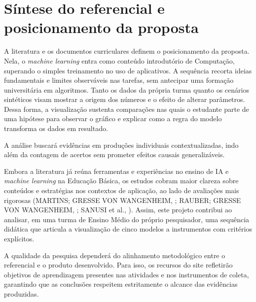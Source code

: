 \section{Síntese do referencial e posicionamento da proposta}

A literatura e os documentos curriculares definem o posicionamento da proposta. Nela, o \textit{machine learning} entra como conteúdo introdutório de Computação, superando o simples treinamento no uso de aplicativos. A sequência recorta ideias fundamentais e limites observáveis nas tarefas, sem antecipar uma formação universitária em algoritmos. Tanto os dados da própria turma quanto os cenários sintéticos visam mostrar a origem dos números e o efeito de alterar parâmetros. Dessa forma, a visualização sustenta comparações nas quais o estudante parte de uma hipótese para observar o gráfico e explicar como a regra do modelo transforma os dados em resultado.

A análise buscará evidências em produções individuais contextualizadas, indo além da contagem de acertos sem prometer efeitos causais generalizáveis.

Embora a literatura já reúna ferramentas e experiências no ensino de IA e \textit{machine learning} na Educação Básica, os estudos cobram maior clareza sobre conteúdos e estratégias nos contextos de aplicação, ao lado de avaliações mais rigorosas (\MakeUppercase{MARTINS; GRESSE VON WANGENHEIM}, \citeyear{martins2023findings}; \MakeUppercase{RAUBER; GRESSE VON WANGENHEIM}, \citeyear{rauber2023assessing}; \MakeUppercase{SANUSI} et al., \citeyear{sanusi2023systematic}). Assim, este projeto contribui ao analisar, em uma turma de Ensino Médio do próprio pesquisador, uma sequência didática que articula a visualização de cinco modelos a instrumentos com critérios explícitos.

A qualidade da pesquisa dependerá do alinhamento metodológico entre o referencial e o produto desenvolvido. Para isso, os recursos do site refletirão objetivos de aprendizagem presentes nas atividades e nos instrumentos de coleta, garantindo que as conclusões respeitem estritamente o alcance das evidências produzidas.
